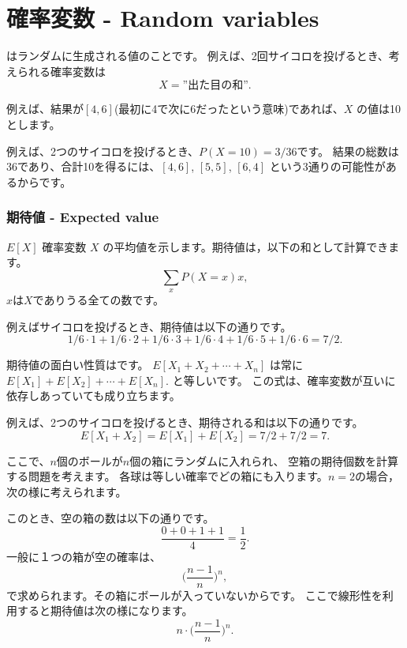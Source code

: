 \section{確率変数 - Random variables}


 はランダムに生成される値のことです。
例えば、2回サイコロを投げるとき、考えられる確率変数は
\[X=\textrm{''出た目の和''}.\]

例えば、結果が$[4, 6]$(最初に4で次に6だったという意味)であれば、$X$ の値は10とします。

例えば、2つのサイコロを投げるとき、$P(X=10)=3/36$です。
結果の総数は36であり、合計10を得るには、$[4,6]$, $[5,5]$, $[6,4]$ という3通りの可能性があるからです。

\subsubsection{期待値 - Expected value}


 $E[X]$ 確率変数 $X$ の平均値を示します。期待値は，以下の和として計算できます。
\[\sum_x P(X=x)x,\]
$x$は$X$でありうる全ての数です。

例えばサイコロを投げるとき、期待値は以下の通りです。
\[1/6 \cdot 1 + 1/6 \cdot 2 + 1/6 \cdot 3 + 1/6 \cdot 4 + 1/6 \cdot 5 + 1/6 \cdot 6 = 7/2.\]

期待値の面白い性質はです。
$E[X_1+X_2+\cdots+X_n]$
は常に
$E[X_1]+E[X_2]+\cdots+E[X_n]$.
と等しいです。
この式は、確率変数が互いに依存しあっていても成り立ちます。

例えば、2つのサイコロを投げるとき、期待される和は以下の通りです。
\[E[X_1+X_2]=E[X_1]+E[X_2]=7/2+7/2=7.\]

ここで、$n$個のボールが$n$個の箱にランダムに入れられ、
空箱の期待個数を計算する問題を考えます。
各球は等しい確率でどの箱にも入ります。$n = 2$の場合，次の様に考えられます。
\begin{center}
\end{center}
このとき、空の箱の数は以下の通りです。
\[\frac{0+0+1+1}{4} = \frac{1}{2}.\]
一般に１つの箱が空の確率は、
\[\Big(\frac{n-1}{n}\Big)^n,\]
で求められます。その箱にボールが入っていないからです。
ここで線形性を利用すると期待値は次の様になります。
\[n \cdot \Big(\frac{n-1}{n}\Big)^n.\]

